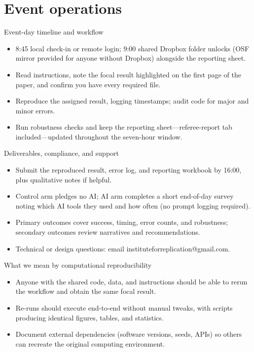 \documentclass[aspectratio=169,professionalfonts]{beamer}
\begin{document}
\section{Event operations}

\begin{frame}{Event-day timeline and workflow}
  \begin{itemize}
    \item 8:45 local check-in or remote login; 9:00 shared Dropbox folder unlocks (OSF mirror provided for anyone without Dropbox) alongside the reporting sheet.
    \item Read instructions, note the focal result highlighted on the first page of the paper, and confirm you have every required file.
    \item Reproduce the assigned result, logging timestamps; audit code for major and minor errors.
    \item Run robustness checks and keep the reporting sheet—referee-report tab included—updated throughout the seven-hour window.
  \end{itemize}
\end{frame}

\begin{frame}{Deliverables, compliance, and support}
  \begin{itemize}
    \item Submit the reproduced result, error log, and reporting workbook by 16:00, plus qualitative notes if helpful.
    \item Control arm pledges no AI; AI arm completes a short end-of-day survey noting which AI tools they used and how often (no prompt logging required).
    \item Primary outcomes cover success, timing, error counts, and robustness; secondary outcomes review narratives and recommendations.
    \item Technical or design questions: email instituteforreplication@gmail.com.
  \end{itemize}
\end{frame}

\begin{frame}{What we mean by computational reproducibility}
  \begin{itemize}
    \item Anyone with the shared code, data, and instructions should be able to rerun the workflow and obtain the same focal result.
    \item Re-runs should execute end-to-end without manual tweaks, with scripts producing identical figures, tables, and statistics.
    \item Document external dependencies (software versions, seeds, APIs) so others can recreate the original computing environment.
  \end{itemize}
\end{frame}
\end{document}
